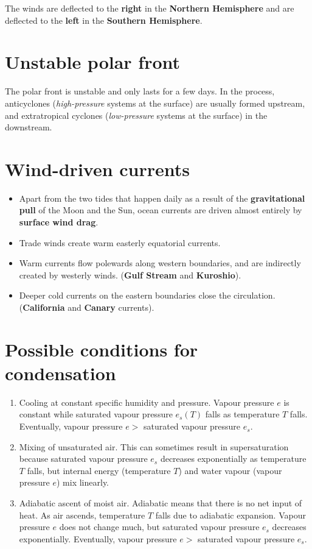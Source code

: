 \documentclass[11pt]{article}
\begin{document}
The winds are deflected to the \textbf{right} in the \textbf{Northern Hemisphere} and are deflected to the \textbf{left} in the \textbf{Southern Hemisphere}.


\section{Unstable polar front}
\label{sec:org6c92549}
The polar front is unstable and only lasts for a few days. In the process, anticyclones (\emph{high-pressure} systems at the surface) are usually formed upstream, and extratropical cyclones (\emph{low-pressure} systems at the surface) in the downstream.


\section{Wind-driven currents}
\label{sec:org2dcd03a}
\begin{itemize}
\item Apart from the two tides that happen daily as a result of the \textbf{gravitational pull} of the Moon and the Sun, ocean currents are driven almost entirely by \textbf{surface wind drag}.
\item Trade winds create warm easterly equatorial currents.
\item Warm currents flow polewards along western boundaries, and are indirectly created by westerly winds. (\textbf{Gulf Stream} and \textbf{Kuroshio}).
\item Deeper cold currents on the eastern boundaries close the circulation. (\textbf{California} and \textbf{Canary} currents).
\end{itemize}


\section{Possible conditions for condensation}
\label{sec:orgf8c2c0b}
\begin{enumerate}
\item Cooling at constant specific humidity and pressure. Vapour pressure \(e\) is constant while saturated vapour pressure \(e_s(T)\) falls as temperature \(T\) falls. Eventually, vapour pressure \(e >\) saturated vapour pressure \(e_s\).
\item Mixing of unsaturated air. This can sometimes result in supersaturation because saturated vapour pressure \(e_s\) decreases exponentially as temperature \(T\) falls, but internal energy (temperature \(T\)) and water vapour (vapour pressure \(e\)) mix linearly.
\item Adiabatic ascent of moist air. Adiabatic means that there is no net input of heat. As air ascends, temperature \(T\) falls due to adiabatic expansion. Vapour pressure \(e\) does not change much, but saturated vapour pressure \(e_s\) decreases exponentially. Eventually, vapour pressure \(e >\) saturated vapour pressure \(e_s\).
\end{enumerate}
\end{document}
